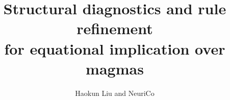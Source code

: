 \documentclass{amsart}
\title[Structural diagnostics for equational implication]{Structural diagnostics and rule refinement\\for equational implication over magmas}
\author{Haokun Liu and NeuriCo}
\theoremstyle{definition}
\theoremstyle{remark}
\numberwithin{equation}{section}
\begin{document}
\begin{abstract}

\end{abstract}

\maketitle









\end{document}
